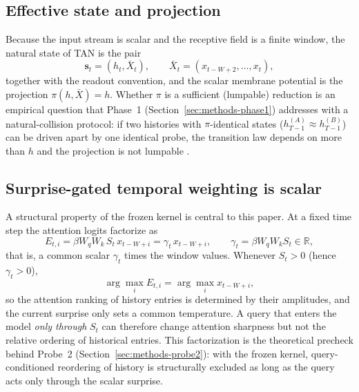 \subsection{Effective state and projection}\label{sec:model-state}

Because the input stream is scalar and the receptive field is a finite
window, the natural state of TAN is the pair
\begin{equation}
  \mathbf{s}_t = (h_t, \bar{X}_t), \qquad
  \bar{X}_t = (x_{t-W+2},\dots,x_t),
\end{equation}
together with the readout convention, and the scalar membrane potential
is the projection $\pi(h,\bar X) = h$.  Whether $\pi$ is a sufficient
(lumpable) reduction is an empirical question that Phase~1
(Section~\ref{sec:methods-phase1}) addresses with a natural-collision
protocol: if two histories with $\pi$-identical states
($h_{T-1}^{(A)} \approx h_{T-1}^{(B)}$) can be driven apart by one
identical probe, the transition law depends on more than $h$ and the
projection is not lumpable \citep{kemeny1960}.

\subsection{Surprise-gated temporal weighting is scalar}\label{sec:model-scalar}

A structural property of the frozen kernel is central to this paper.
At a fixed time step the attention logits factorize as
\begin{equation}
  E_{t,i} = \beta W_q W_k\, S_t \, x_{t-W+i}
  = \gamma_t\, x_{t-W+i},
  \qquad \gamma_t = \beta W_q W_k S_t \in \mathbb{R},
\end{equation}
that is, a common scalar $\gamma_t$ times the window values.  Whenever
$S_t > 0$ (hence $\gamma_t > 0$),
\begin{equation}
  \arg\max_i E_{t,i} = \arg\max_i x_{t-W+i},
\end{equation}
so the attention ranking of history entries is determined by their
amplitudes, and the current surprise only sets a common temperature.  A
query that enters the model \emph{only through} $S_t$ can therefore
change attention sharpness but not the relative ordering of historical
entries.  This factorization is the theoretical precheck behind
Probe~2 (Section~\ref{sec:methods-probe2}): with the frozen kernel,
query-conditioned reordering of history is structurally excluded as long
as the query acts only through the scalar surprise.

